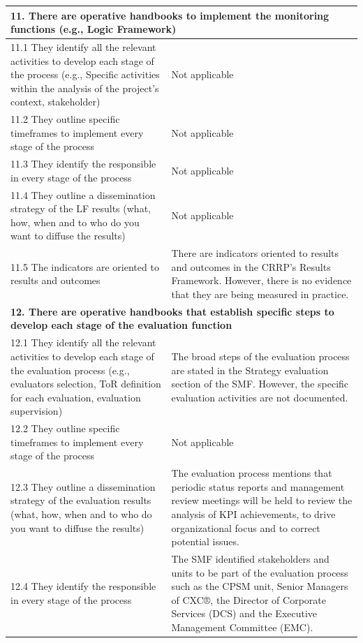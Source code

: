 \documentclass[
  10pt,
]{book}
\begin{document}
\begin{table}
\begin{tabular}[t]{l|l}
\hline
\multicolumn{2}{l}{\textbf{11. There are operative handbooks to implement the monitoring functions (e.g., Logic Framework)}}\\
\hline
\hspace{1em}\hspace{1em}11.1 They identify all the relevant activities to develop each stage of the process (e.g., Specific activities within the analysis of the project's context, stakeholder) & Not applicable\\
\hline
\hspace{1em}\hspace{1em}11.2 They outline specific timeframes to implement every stage of the process & Not applicable\\
\hline
\hspace{1em}11.3 They identify the responsible in every stage of the process & Not applicable\\
\hline
\hspace{1em}11.4 They outline a dissemination strategy of the LF results (what, how, when and to who do you want to diffuse the results) & Not applicable\\
\hline
\hspace{1em}11.5 The indicators are oriented to results and outcomes & There are indicators oriented to results and outcomes in the CRRP’s Results Framework. However, there is no evidence that they are being measured in practice.\\
\hline
\multicolumn{2}{l}{\textbf{12. There are operative handbooks that establish specific steps to develop each stage of the evaluation function}}\\
\hline
\hspace{1em}12.1 They identify all the relevant activities to develop each stage of the evaluation process (e.g., evaluators selection, ToR definition for each evaluation, evaluation supervision) & The broad steps of the evaluation process are stated in the Strategy evaluation section of the SMF. However, the specific evaluation activities are not documented.\\
\hline
\hspace{1em}12.2 They outline specific timeframes to implement every stage of the process & Not applicable\\
\hline
\hspace{1em}12.3 They outline a dissemination strategy of the evaluation results (what, how, when and to who do you want to diffuse the results) & The evaluation process mentions that periodic status reports and management review meetings will be held to review the analysis of KPI achievements, to drive organizational focus and to correct potential issues.\\
\hline
\hspace{1em}12.4 They identify the responsible in every stage of the process & The SMF identified stakeholders and units to be part of the evaluation process such as the CPSM unit, Senior Managers of CXC®,  the Director of Corporate Services (DCS) and the Executive Management Committee (EMC).\\
\hline
\end{tabular}
\end{table}
\end{document}

